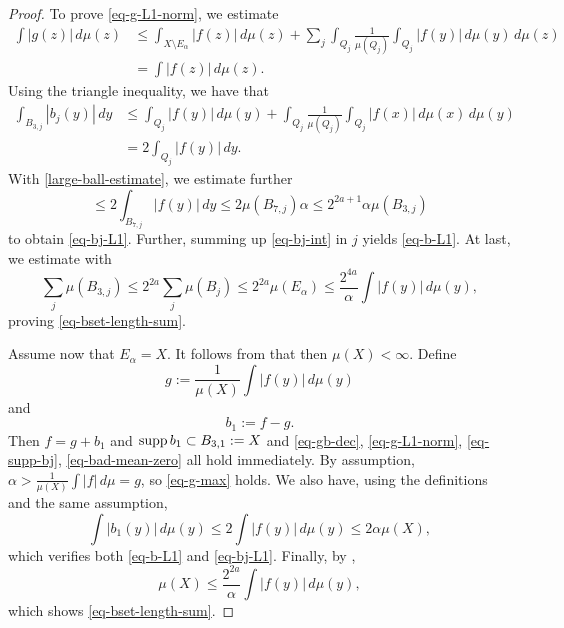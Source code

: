 \begin{proof}
To prove \eqref{eq-g-L1-norm}, we estimate
\begin{align*}
    \int |g(z)|\, d\mu(z) &\le \int_{X\setminus E_\alpha} |f(z)|\, d\mu(z) + \sum_{j} \int_{Q_j}\frac{1}{\mu(Q_j)}\int_{Q_j}|f(y)|\, d\mu(y)\,d\mu(z) \\
    &= \int |f(z)|\,d\mu(z).
\end{align*}
Using the triangle inequality, we have that
\begin{align}
    \label{eq-bj-int}
    \int_{B_{3,j}} |b_j(y)|\, dy &\le \int_{Q_j} |f(y)|\, d\mu(y) + \int_{Q_j} \frac{1}{\mu(Q_j)}\int_{Q_j} |f(x)|\, d\mu(x)\, d\mu(y) \\
    &= 2 \int_{Q_j} |f(y)|\, dy.
\end{align}
With \eqref{large-ball-estimate}, we estimate further
\begin{equation}
    \le 2 \int_{B_{7,j}} |f(y)|\, dy \le 2\mu(B_{7,j})\alpha \le 2^{2a+1} \alpha \mu(B_{3,j})
\end{equation}
to obtain \eqref{eq-bj-L1}.
Further, summing up \eqref{eq-bj-int} in $j$ yields \eqref{eq-b-L1}.
At last, we estimate with 
\begin{equation}
    \sum_j \mu(B_{3,j}) \le 2^{2a} \sum_j \mu(B_j) \le 2^{2a} \mu(E_\alpha) \le \frac{2^{4a}}{\alpha}\int |f(y)|\, d\mu(y),
\end{equation}
proving \eqref{eq-bset-length-sum}.

Assume now that $E_\alpha = X$. It follows from  that then $\mu(X)<\infty$.
Define
\begin{equation*}
    g := \frac{1}{\mu(X)} \int |f(y)|\,d\mu(y)
\end{equation*}
and
\begin{equation*}
    b_1 := f - g.
\end{equation*}
Then $f = g + b_1$ and $\operatorname{\operatorname{supp}} b_1 \subset B_{3,1}:=X$ and \eqref{eq-gb-dec}, \eqref{eq-g-L1-norm}, \eqref{eq-supp-bj}, \eqref{eq-bad-mean-zero} all hold immediately. By assumption, $\alpha>\frac{1}{\mu(X)}\int |f|\,d\mu = g$, so \eqref{eq-g-max} holds.
We also have, using the definitions and the same assumption,
\begin{equation}
    \int |b_1(y)|\, d\mu(y) \le 2 \int |f(y)|\,d\mu(y) \le 2\alpha\mu(X),
\end{equation}
which verifies both \eqref{eq-b-L1} and \eqref{eq-bj-L1}.
Finally, by ,
\begin{equation*}
    \mu(X) \le \frac{2^{2a}}{\alpha} \int |f(y)|\,d\mu(y),
\end{equation*}
which shows \eqref{eq-bset-length-sum}.
\end{proof}

